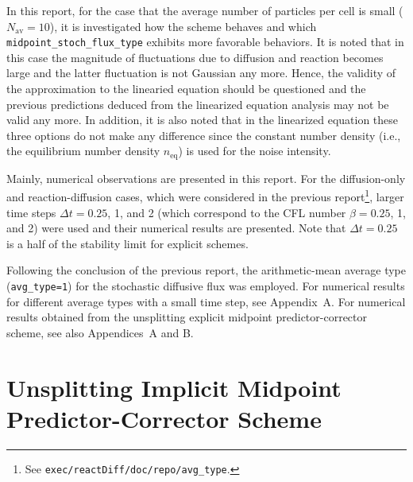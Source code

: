 \documentclass{article}
\begin{document}
In this report, for the case that the average number of particles per cell is small ($N_\mathrm{av}=10$), it is investigated how the scheme behaves and which \texttt{midpoint\_stoch\_flux\_type} exhibits more favorable behaviors. 
It is noted that in this case the magnitude of fluctuations due to diffusion and reaction becomes large and the latter fluctuation is not Gaussian any more.
Hence, the validity of the approximation to the linearied equation should be questioned and the previous predictions deduced from the linearized equation analysis may not be valid any more.
In addition, it is also noted that in the linearized equation these three options do not make any difference since the constant number density (i.e., the equilibrium number density $n_\mathrm{eq}$) is used for the noise intensity.

Mainly, numerical observations are presented in this report.
For the diffusion-only and reaction-diffusion cases, which were considered in the previous report\footnote{See \texttt{exec/reactDiff/doc/repo/avg\_type}.}, larger time steps $\Delta t=0.25$, 1, and 2 (which correspond to the CFL number $\beta=0.25$, 1, and 2) were used and their numerical results are presented.
Note that $\Delta t=0.25$ is a half of the stability limit for explicit schemes.

Following the conclusion of the previous report, the arithmetic-mean average type (\texttt{avg\_type=1}) for the stochastic diffusive flux was employed.
For numerical results for different average types with a small time step, see Appendix~A.
For numerical results obtained from the unsplitting explicit midpoint predictor-corrector scheme, see also Appendices~A and B.

\section{\label{sec_implicit_scheme}Unsplitting Implicit Midpoint Predictor-Corrector Scheme}
\end{document}
